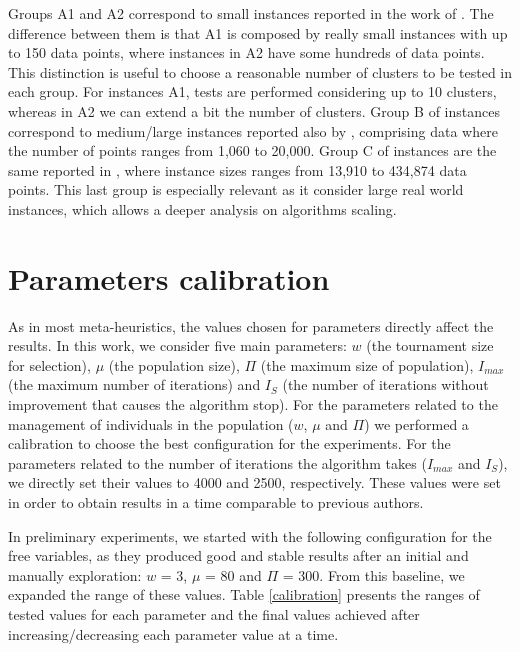 Groups A1 and A2 correspond to small instances reported in the work of \cite{Ordin2014}. The difference between them is that A1 is composed by really small instances with up to 150 data points, where instances in A2 have some hundreds of data points. This distinction is useful to choose a reasonable number of clusters to be tested in each group. For instances A1, tests are performed considering up to 10 clusters, whereas in A2 we can extend a bit the number of clusters. Group B of instances correspond to medium/large instances reported also by \cite{Ordin2014}, comprising data where the number of points ranges from 1,060 to 20,000. Group C of instances are the same reported in \cite{Bagirov2016}, where instance sizes ranges from 13,910 to 434,874 data points. This last group is especially relevant as it consider large real world instances, which allows a deeper analysis on algorithms scaling.

\section{Parameters calibration}
\label{sec:calibration}
As in most meta-heuristics, the values chosen for parameters directly affect the results. In this work, we consider five main parameters: $w$ (the tournament size for selection), $\mu$ (the population size), $\Pi$ (the maximum size of population), $I_{max}$ (the maximum number of iterations) and $I_S$ (the number of iterations without improvement that causes the algorithm stop). For the parameters related to the management of individuals in the population ($w$, $\mu$ and $\Pi$) we performed a calibration to choose the best configuration for the experiments. For the parameters related to the number of iterations the algorithm takes ($I_{max}$ and $I_S$), we directly set their values to 4000 and 2500, respectively. These values were set in order to obtain results in a time comparable to previous authors.

In preliminary experiments, we started with the following configuration for the free variables, as they produced good and stable results after an initial and manually exploration: $w$ = 3, $\mu$ = 80 and $\Pi$ = 300. From this baseline, we expanded the range of these values. Table \ref{calibration} presents the ranges of tested values for each parameter and the final values achieved after increasing/decreasing each parameter value at a time.



